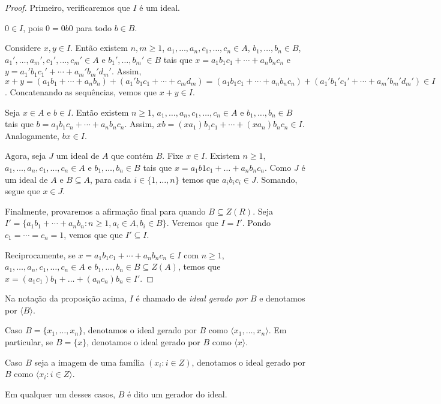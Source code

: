 \begin{proof}
    Primeiro, verificaremos que $I$ é um ideal.

    $0 \in I$, pois $0=0b0$ para todo $b \in B$.

    Considere $x, y \in I$.
    Então existem $n, m\geq 1$, $a_1, \dots, a_n, c_1, \dots, c_n \in A$, $b_1, \dots, b_n \in B$, $a_1', \dots, a_m', c_1', \dots, c_m' \in A$ e $b_1', \dots, b_m' \in B$ tais que $x=a_1b_1c_1+\cdots+a_nb_nc_n$ e $y=a_1'b_1c_1'+\cdots+a_m'b_m'd_m'$.
    Assim, $x+y=(a_1b_1+\cdots+a_nb_n)+(a_1'b_1c_1+\cdots+c_md_m)=(a_1b_1c_1+\cdots+a_nb_nc_n)+(a_1'b_1'c_1'+\cdots+a_m'b_m'd_m') \in I$.
    Concatenando as sequências, vemos que $x+y\in I$.

    Seja $x \in A$ e $b \in I$.
    Então existem $n\geq 1$, $a_1, \dots, a_n, c_1, \dots, c_n \in A$ e $b_1, \dots, b_n \in B$ tais que $b=a_1b_1c_n+\cdots+a_nb_nc_n$. Assim, $xb=(xa_1)b_1c_1+\cdots+(xa_n)b_nc_n\in I$.
    Analogamente, $bx \in I$.

    Agora, seja $J$ um ideal de $A$ que contém $B$.
    Fixe $x \in I$.
    Existem $n\geq 1$, $a_1, \dots, a_n, c_1, \dots, c_n\in A$ e $b_1, \dots, b_n \in B$ tais que $x=a_1b1c_1+\dots+a_nb_nc_n$.
    Como $J$ é um ideal de $A$ e $B\subseteq A$, para cada $i \in \{1, \dots, n\}$ temos que $a_ib_ic_i \in J$.
    Somando, segue que $x \in J$.

    Finalmente, provaremos a afirmação final para quando $B\subseteq Z(R)$. Seja $I'=\{a_1b_1+\cdots+a_nb_n: n\geq 1, a_i \in A, b_i \in B\}$.
    Veremos que $I=I'$.
    Pondo $c_1=\cdots=c_n=1$, vemos que que $I'\subseteq I$.

    Reciprocamente, se $x=a_1b_1c_1+\cdots+a_nb_nc_n \in I$ com $n\geq 1$, $a_1,\dots, a_n, c_1, \dots, c_n \in A$ e $b_1, \dots, b_n \in B\subseteq Z(A)$, temos que $x=(a_1c_1)b_1+\dots+(a_nc_n)b_n\in I'$.
\end{proof}


\begin{definition}
    Na notação da proposição acima, $I$ é chamado de \emph{ideal gerado por $B$} e denotamos por $\langle B \rangle$. 
    
    Caso $B=\{x_1, \dots, x_n\}$, denotamos o ideal gerado por $B$ como $\langle x_1, \dots, x_n \rangle$.
    Em particular, se $B=\{x\}$, denotamos o ideal gerado por $B$ como $\langle x \rangle$.
    
    Caso $B$ seja a imagem de uma família $(x_i: i \in Z)$, denotamos o ideal gerado por $B$ como $\langle x_i: i \in Z \rangle$. 

    Em qualquer um desses casos, $B$ é dito um gerador do ideal.
\end{definition}

